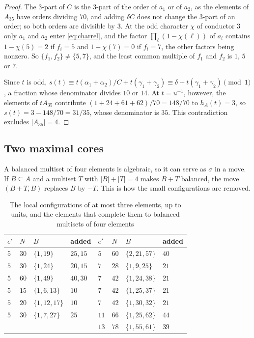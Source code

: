 \begin{proof}
The $3$-part of $C$ is the $3$-part of the order of $a_{1}$ or of $a_{2}$, as
the elements of $A_{35}$ have orders dividing $70$, and adding $\delta C$ does
not change the $3$-part of an order; so both orders are divisible by $3$.
At the odd character $\chi$ of conductor $3$ only $a_{1}$ and $a_{2}$ enter
\eqref{eq:charrel}, and the factor $\prod_{\ell}(1-\chi(\ell))$ of $a_{i}$
contains $1-\chi(5)=2$ if $f_{i}=5$ and $1-\chi(7)=0$ if $f_{i}=7$, the other
factors being nonzero. So $\{f_{1},f_{2}\}\ne\{5,7\}$, and the least common
multiple of $f_{1}$ and $f_{2}$ is $1$, $5$ or $7$.

Since $t$ is odd, $s(t)\equiv t(\alpha_{1}+\alpha_{2})/C+t(\gamma_{1}+
\gamma_{2})\equiv\delta+t(\gamma_{1}+\gamma_{2})\pmod1$, a fraction whose
denominator divides $10$ or $14$. At $t=u^{-1}$, however, the elements of
$tA_{35}$ contribute $(1+24+61+62)/70=148/70$ to $h_{A}(t)=3$, so
$s(t)=3-148/70=31/35$, whose denominator is $35$. This contradiction
excludes $|A_{35}|=4$.
\end{proof}

\subsection{Two maximal cores}
A balanced multiset of four elements is algebraic, so it can serve as
$\sigma$ in a move. If $B\subseteq A$ and a multiset $T$ with $|B|+|T|=4$
makes $B+T$ balanced, the move $(B+T,B)$ replaces $B$ by $-T$. This is how
the small configurations are removed.

\begin{table}[ht]
\centering
\caption{The local configurations of at most three elements, up to units,
and the elements that complete them to balanced multisets of four
elements}\label{tab:small}
\begin{tabular}{@{}llll@{\qquad}llll@{}}
\hline
$e'$ & $N$ & $B$ & added & $e'$ & $N$ & $B$ & added\\
\hline
$5$ & $30$ & $\{1,19\}$ & $25,15$ & $5$ & $60$ & $\{2,21,57\}$ & $40$\\
$5$ & $30$ & $\{1,24\}$ & $20,15$ & $7$ & $28$ & $\{1,9,25\}$ & $21$\\
$5$ & $60$ & $\{1,49\}$ & $40,30$ & $7$ & $42$ & $\{1,24,38\}$ & $21$\\
$5$ & $15$ & $\{1,6,13\}$ & $10$ & $7$ & $42$ & $\{1,25,37\}$ & $21$\\
$5$ & $20$ & $\{1,12,17\}$ & $10$ & $7$ & $42$ & $\{1,30,32\}$ & $21$\\
$5$ & $30$ & $\{1,7,27\}$ & $25$ & $11$ & $66$ & $\{1,25,62\}$ & $44$\\
& & & & $13$ & $78$ & $\{1,55,61\}$ & $39$\\
\hline
\end{tabular}
\end{table}

